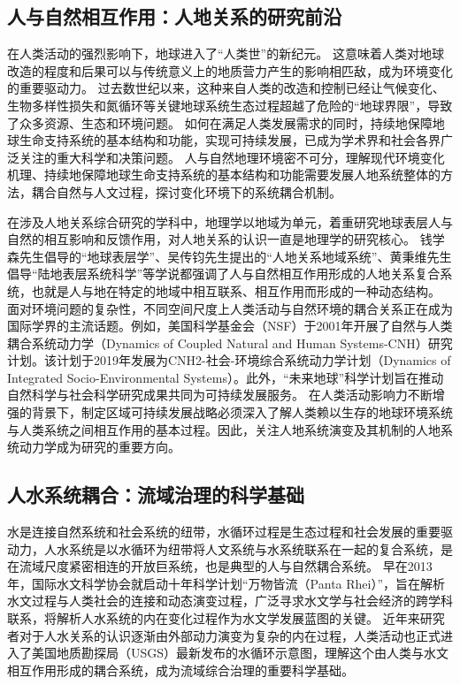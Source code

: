 \subsection{人与自然相互作用：人地关系的研究前沿}

在人类活动的强烈影响下，地球进入了“人类世”的新纪元。
这意味着人类对地球改造的程度和后果可以与传统意义上的地质营力产生的影响相匹敌，成为环境变化的重要驱动力\cite{lenton2019, lewis2015, lewis2018}。
过去数世纪以来，这种来自人类的改造和控制已经让气候变化、生物多样性损失和氮循环等关键地球系统生态过程超越了危险的“地球界限”，导致了众多资源、生态和环境问题\cite{steffen2015}。
如何在满足人类发展需求的同时，持续地保障地球生命支持系统的基本结构和功能，实现可持续发展，已成为学术界和社会各界广泛关注的重大科学和决策问题\cite{wu2014}。
人与自然地理环境密不可分，理解现代环境变化机理、持续地保障地球生命支持系统的基本结构和功能需要发展人地系统整体的方法，耦合自然与人文过程，探讨变化环境下的系统耦合机制\cite{fu2015}。

在涉及人地关系综合研究的学科中，地理学以地域为单元，着重研究地球表层人与自然的相互影响和反馈作用，对人地关系的认识一直是地理学的研究核心\cite{wu1991}。
钱学森先生倡导的“地球表层学”、吴传钧先生提出的“人地关系地域系统”、黄秉维先生倡导“陆地表层系统科学”等学说都强调了人与自然相互作用形成的人地关系复合系统，也就是人与地在特定的地域中相互联系、相互作用而形成的一种动态结构。
面对环境问题的复杂性，不同空间尺度上人类活动与自然环境的耦合关系正在成为国际学界的主流话题。例如，美国科学基金会（NSF）于2001年开展了自然与人类耦合系统动力学（Dynamics of Coupled Natural and Human Systems-CNH）研究计划。该计划于2019年发展为CNH2-社会-环境综合系统动力学计划（Dynamics of Integrated Socio-Environmental Systems）。此外，“未来地球”科学计划旨在推动自然科学与社会科学研究成果共同为可持续发展服务\cite{fu2015}。
在人类活动影响力不断增强的背景下，制定区域可持续发展战略必须深入了解人类赖以生存的地球环境系统与人类系统之间相互作用的基本过程。因此，关注人地系统演变及其机制的人地系统动力学成为研究的重要方向\cite{fu2022}。

\subsection{人水系统耦合：流域治理的科学基础}

水是连接自然系统和社会系统的纽带，水循环过程是生态过程和社会发展的重要驱动力，人水系统是以水循环为纽带将人文系统与水系统联系在一起的复合系统，是在流域尺度紧密相连的开放巨系统，也是典型的人与自然耦合系统\cite{li2007}。
早在2013年，国际水文科学协会就启动十年科学计划“万物皆流（Panta Rhei）”，旨在解析水文过程与人类社会的连接和动态演变过程\cite{montanari2013}，广泛寻求水文学与社会经济的跨学科联系，将解析人水系统的内在变化过程作为水文学发展蓝图的关键。
近年来研究者对于人\textendash{}水关系的认识逐渐由外部动力演变为复杂的内在过程，人类活动也正式进入了美国地质勘探局（USGS）最新发布的水循环示意图\cite{abbott2019, abbott2019a}，理解这个由人类与水文相互作用形成的耦合系统，成为流域综合治理的重要科学基础。

